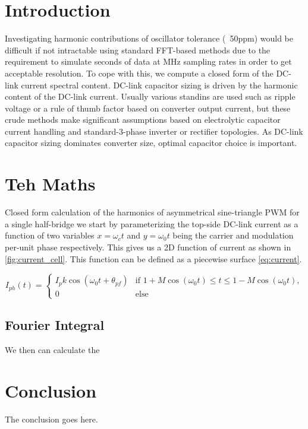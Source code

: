 \section{Introduction}
Investigating harmonic contributions of oscillator tolerance (~50ppm) would be
difficult if not intractable using standard FFT-based methods due to the
requirement to simulate seconds of data at MHz sampling rates in order to get
acceptable resolution.
To cope with this, we compute a closed form of the DC-link current spectral content.
DC-link capacitor sizing is driven by the harmonic content of the DC-link current.
Usually various standins are used such as ripple voltage or a rule of thumb
factor based on converter output current, but these crude methods make
significant assumptions based on electrolytic capacitor current handling and
standard-3-phase inverter or rectifier topologies.
As DC-link capacitor sizing dominates converter size, optimal capacitor choice is important.

\section{Teh Maths}
Closed form calculation of the harmonics of asymmetrical sine-triangle PWM for
a single half-bridge we start by parameterizing the top-side DC-link current
as a function of two variables $x=\omega_{c} t$ and $y=\omega_{0} t$ being the
carrier and modulation per-unit phase respectively.
This gives us a 2D function of current as shown in \autoref{fig:current_cell}.
This function can be defined as a piecewise surface
\autoref{eq:current}.

\begin{equation}
\label{eq:current}
I_{ph} (t) = 
	\begin{cases}
	I_pk \cos \left({\omega_{0} t + \theta_{pf}}\right) 
	& \text{if } 1 + M \cos\left({\omega_{0} t}\right)
	\leq t \leq 1 - M \cos\left({\omega_{0} t}\right),
	\\
	0 & \text{else}
	\end{cases}
\end{equation}

\subsection{Fourier Integral}
We then can calculate the 

\section{Conclusion}
The conclusion goes here.

